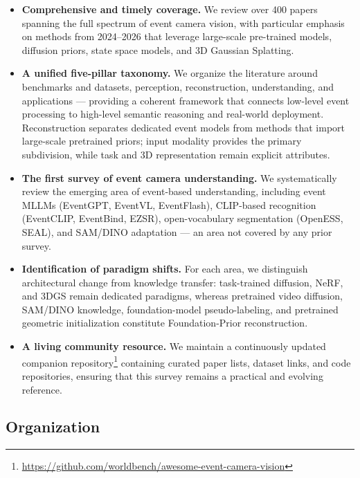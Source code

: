 \begin{itemize}[leftmargin=*]

    \item \textbf{Comprehensive and timely coverage.} We review over 400 papers spanning the full spectrum of event camera vision, with particular emphasis on methods from 2024--2026 that leverage large-scale pre-trained models, diffusion priors, state space models, and 3D Gaussian Splatting.

    \item \textbf{A unified five-pillar taxonomy.} We organize the literature around benchmarks and datasets, perception, reconstruction, understanding, and applications --- providing a coherent framework that connects low-level event processing to high-level semantic reasoning and real-world deployment. Reconstruction separates dedicated event models from methods that import large-scale pretrained priors; input modality provides the primary subdivision, while task and 3D representation remain explicit attributes.

    \item \textbf{The first survey of event camera understanding.} We systematically review the emerging area of event-based understanding, including event MLLMs (EventGPT, EventVL, EventFlash), CLIP-based recognition (EventCLIP, EventBind, EZSR), open-vocabulary segmentation (OpenESS, SEAL), and SAM/DINO adaptation --- an area not covered by any prior survey.

    \item \textbf{Identification of paradigm shifts.} For each area, we distinguish architectural change from knowledge transfer: task-trained diffusion, NeRF, and 3DGS remain dedicated paradigms, whereas pretrained video diffusion, SAM/DINO knowledge, foundation-model pseudo-labeling, and pretrained geometric initialization constitute Foundation-Prior reconstruction.

    \item \textbf{A living community resource.} We maintain a continuously updated companion repository\footnote{\url{https://github.com/worldbench/awesome-event-camera-vision}} containing curated paper lists, dataset links, and code repositories, ensuring that this survey remains a practical and evolving reference.

\end{itemize}


\subsection{Organization}
\label{sec:intro_organization}

